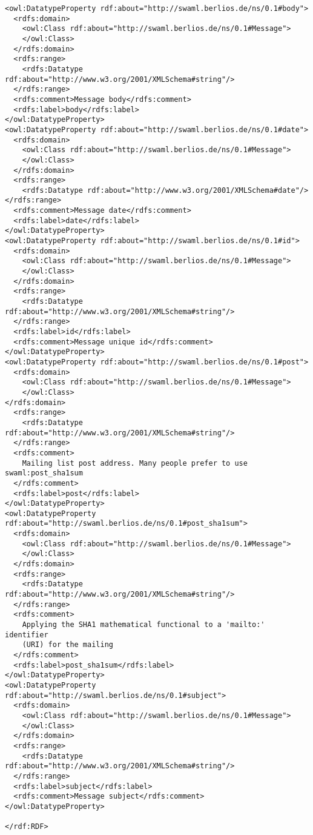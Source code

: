 \begin{lstlisting}
<owl:DatatypeProperty rdf:about="http://swaml.berlios.de/ns/0.1#body">
  <rdfs:domain>
    <owl:Class rdf:about="http://swaml.berlios.de/ns/0.1#Message">
    </owl:Class>
  </rdfs:domain>
  <rdfs:range>
    <rdfs:Datatype rdf:about="http://www.w3.org/2001/XMLSchema#string"/>
  </rdfs:range>
  <rdfs:comment>Message body</rdfs:comment>
  <rdfs:label>body</rdfs:label>
</owl:DatatypeProperty>
<owl:DatatypeProperty rdf:about="http://swaml.berlios.de/ns/0.1#date">
  <rdfs:domain>
    <owl:Class rdf:about="http://swaml.berlios.de/ns/0.1#Message">
    </owl:Class>
  </rdfs:domain>
  <rdfs:range>
    <rdfs:Datatype rdf:about="http://www.w3.org/2001/XMLSchema#date"/>
</rdfs:range>
  <rdfs:comment>Message date</rdfs:comment>
  <rdfs:label>date</rdfs:label>
</owl:DatatypeProperty>
<owl:DatatypeProperty rdf:about="http://swaml.berlios.de/ns/0.1#id">
  <rdfs:domain>
    <owl:Class rdf:about="http://swaml.berlios.de/ns/0.1#Message">
    </owl:Class>
  </rdfs:domain>
  <rdfs:range>
    <rdfs:Datatype rdf:about="http://www.w3.org/2001/XMLSchema#string"/>
  </rdfs:range>
  <rdfs:label>id</rdfs:label>
  <rdfs:comment>Message unique id</rdfs:comment>
</owl:DatatypeProperty>
<owl:DatatypeProperty rdf:about="http://swaml.berlios.de/ns/0.1#post">
  <rdfs:domain>
    <owl:Class rdf:about="http://swaml.berlios.de/ns/0.1#Message">
    </owl:Class>
</rdfs:domain>
  <rdfs:range>
    <rdfs:Datatype rdf:about="http://www.w3.org/2001/XMLSchema#string"/>
  </rdfs:range>
  <rdfs:comment>
    Mailing list post address. Many people prefer to use swaml:post_sha1sum
  </rdfs:comment>
  <rdfs:label>post</rdfs:label>
</owl:DatatypeProperty>
<owl:DatatypeProperty rdf:about="http://swaml.berlios.de/ns/0.1#post_sha1sum">
  <rdfs:domain>
    <owl:Class rdf:about="http://swaml.berlios.de/ns/0.1#Message">
    </owl:Class>
  </rdfs:domain>
  <rdfs:range>
    <rdfs:Datatype rdf:about="http://www.w3.org/2001/XMLSchema#string"/>
  </rdfs:range>
  <rdfs:comment>
    Applying the SHA1 mathematical functional to a 'mailto:' identifier 
    (URI) for the mailing
  </rdfs:comment>
  <rdfs:label>post_sha1sum</rdfs:label>
</owl:DatatypeProperty>
<owl:DatatypeProperty rdf:about="http://swaml.berlios.de/ns/0.1#subject">
  <rdfs:domain>
    <owl:Class rdf:about="http://swaml.berlios.de/ns/0.1#Message">
    </owl:Class>
  </rdfs:domain>
  <rdfs:range>
    <rdfs:Datatype rdf:about="http://www.w3.org/2001/XMLSchema#string"/>
  </rdfs:range>
  <rdfs:label>subject</rdfs:label>
  <rdfs:comment>Message subject</rdfs:comment>
</owl:DatatypeProperty>

</rdf:RDF>
\end{lstlisting}

